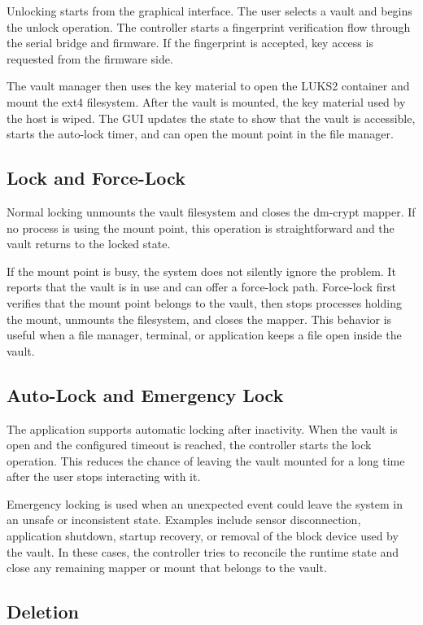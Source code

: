 Unlocking starts from the graphical interface. The user selects a vault and begins the unlock operation. The controller starts a fingerprint verification flow through the serial bridge and firmware. If the fingerprint is accepted, key access is requested from the firmware side.

The vault manager then uses the key material to open the LUKS2 container and mount the ext4 filesystem. After the vault is mounted, the key material used by the host is wiped. The GUI updates the state to show that the vault is accessible, starts the auto-lock timer, and can open the mount point in the file manager.

\subsection{Lock and Force-Lock}

Normal locking unmounts the vault filesystem and closes the dm-crypt mapper. If no process is using the mount point, this operation is straightforward and the vault returns to the locked state.

If the mount point is busy, the system does not silently ignore the problem. It reports that the vault is in use and can offer a force-lock path. Force-lock first verifies that the mount point belongs to the vault, then stops processes holding the mount, unmounts the filesystem, and closes the mapper. This behavior is useful when a file manager, terminal, or application keeps a file open inside the vault.

\subsection{Auto-Lock and Emergency Lock}

The application supports automatic locking after inactivity. When the vault is open and the configured timeout is reached, the controller starts the lock operation. This reduces the chance of leaving the vault mounted for a long time after the user stops interacting with it.

Emergency locking is used when an unexpected event could leave the system in an unsafe or inconsistent state. Examples include sensor disconnection, application shutdown, startup recovery, or removal of the block device used by the vault. In these cases, the controller tries to reconcile the runtime state and close any remaining mapper or mount that belongs to the vault.

\subsection{Deletion}

